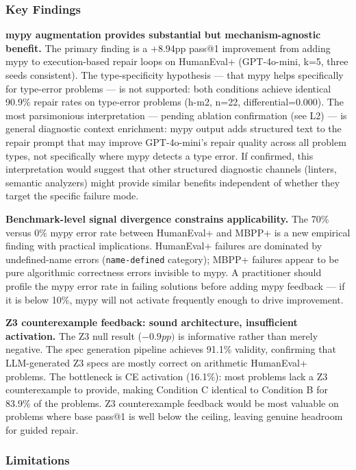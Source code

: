 
\subsubsection{Key Findings}

\textbf{mypy augmentation provides substantial but mechanism-agnostic benefit.} The primary finding is a +8.94pp pass@1 improvement from adding mypy to execution-based repair loops on HumanEval+ (GPT-4o-mini, k=5, three seeds consistent). The type-specificity hypothesis --- that mypy helps specifically for type-error problems --- is not supported: both conditions achieve identical 90.9\% repair rates on type-error problems (h-m2, n=22, differential=0.000). The most parsimonious interpretation --- pending ablation confirmation (see L2) --- is general diagnostic context enrichment: mypy output adds structured text to the repair prompt that may improve GPT-4o-mini's repair quality across all problem types, not specifically where mypy detects a type error. If confirmed, this interpretation would suggest that other structured diagnostic channels (linters, semantic analyzers) might provide similar benefits independent of whether they target the specific failure mode.

\textbf{Benchmark-level signal divergence constrains applicability.} The 70\% versus 0\% mypy error rate between HumanEval+ and MBPP+ is a new empirical finding with practical implications. HumanEval+ failures are dominated by undefined-name errors (\texttt{name-defined} category); MBPP+ failures appear to be pure algorithmic correctness errors invisible to mypy. A practitioner should profile the mypy error rate in failing solutions before adding mypy feedback --- if it is below 10\%, mypy will not activate frequently enough to drive improvement.

\textbf{Z3 counterexample feedback: sound architecture, insufficient activation.} The Z3 null result ($-0.9pp)$ is informative rather than merely negative. The spec generation pipeline achieves 91.1\% validity, confirming that LLM-generated Z3 specs are mostly correct on arithmetic HumanEval+ problems. The bottleneck is CE activation (16.1\%): most problems lack a Z3 counterexample to provide, making Condition C identical to Condition B for 83.9\% of the problems. Z3 counterexample feedback would be most valuable on problems where base pass@1 is well below the ceiling, leaving genuine headroom for guided repair.

\subsubsection{Limitations}

